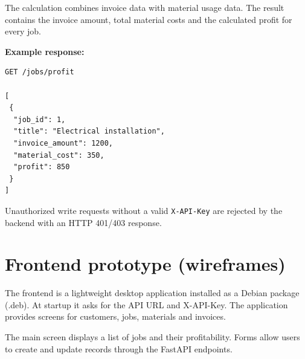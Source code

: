 \documentclass[11pt,a4paper]{article}
\begin{document}
The calculation combines invoice data with material usage data. The result
contains the invoice amount, total material costs and the calculated profit
for every job.

\textbf{Example response:}

\begin{verbatim}
GET /jobs/profit

[
 {
  "job_id": 1,
  "title": "Electrical installation",
  "invoice_amount": 1200,
  "material_cost": 350,
  "profit": 850
 }
]
\end{verbatim}

Unauthorized write requests without a valid
\texttt{X-API-Key} are rejected by the backend with an HTTP 401/403 response.
\section{Frontend prototype (wireframes)}

The frontend is a lightweight desktop application installed as a Debian
package (.deb). At startup it asks for the API URL and X-API-Key.
The application provides screens for customers, jobs, materials and invoices.

The main screen displays a list of jobs and their profitability.
Forms allow users to create and update records through the FastAPI endpoints.
\end{document}
